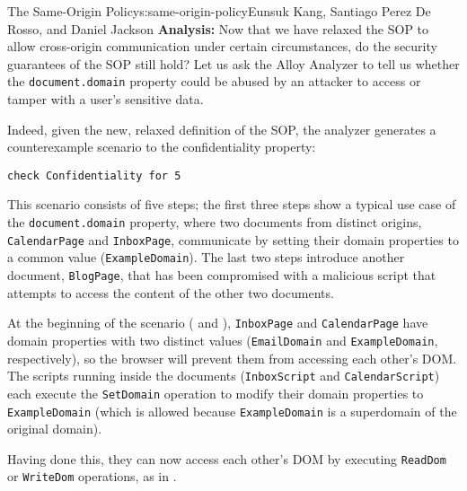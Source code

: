 \begin{aosachapter}{The Same-Origin Policy}{s:same-origin-policy}{Eunsuk Kang, Santiago Perez De Rosso, and Daniel Jackson}
\textbf{Analysis:} Now that we have relaxed the SOP to allow
cross-origin communication under certain circumstances, do the security
guarantees of the SOP still hold? Let us ask the Alloy Analyzer to tell
us whether the \texttt{document.domain} property could be abused by an
attacker to access or tamper with a user's sensitive data.

Indeed, given the new, relaxed definition of the SOP, the analyzer
generates a counterexample scenario to the confidentiality property:

\begin{verbatim}
check Confidentiality for 5
\end{verbatim}

This scenario consists of five steps; the first three steps show a
typical use case of the \texttt{document.domain} property, where two
documents from distinct origins, \texttt{CalendarPage} and
\texttt{InboxPage}, communicate by setting their domain properties to a
common value (\texttt{ExampleDomain}). The last two steps introduce
another document, \texttt{BlogPage}, that has been compromised with a
malicious script that attempts to access the content of the other two
documents.

At the beginning of the scenario
( and
),
\texttt{InboxPage} and \texttt{CalendarPage} have domain properties with
two distinct values (\texttt{EmailDomain} and \texttt{ExampleDomain},
respectively), so the browser will prevent them from accessing each
other's DOM. The scripts running inside the documents
(\texttt{InboxScript} and \texttt{CalendarScript}) each execute the
\texttt{SetDomain} operation to modify their domain properties to
\texttt{ExampleDomain} (which is allowed because \texttt{ExampleDomain}
is a superdomain of the original domain).


Having done this, they can now access each other's DOM by executing
\texttt{ReadDom} or \texttt{WriteDom} operations, as in
.



\end{aosachapter}
